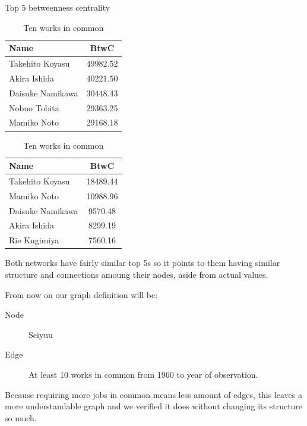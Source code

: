 \begin{frame}{Top 5 betweenness centrality}
\begin{table}[!htb]
    \begin{minipage}{.5\textwidth}
        \centering
            \begin{tabular}{|l|c|}
				\hline
				Name & BtwC \\
				\hline
				Takehito Koyasu & 49982.52 \\
				\hline
				Akira Ishida & 40221.50 \\
				\hline
				Daisuke Namikawa & 30448.43 \\
				\hline
				Nobuo Tobita & 29363.25 \\
				\hline
				Mamiko Noto & 29168.18 \\
				\hline
		\end{tabular}
        \caption{One work in common}
    \end{minipage}%
    \begin{minipage}{.5\textwidth}
        \centering
        \begin{tabular}{|l|c|}
				\hline
				Name & BtwC \\
				\hline
				Takehito Koyasu & 18489.44 \\
				\hline
				Mamiko Noto & 10988.96 \\
				\hline
				Daisuke Namikawa & 9570.48 \\
				\hline
				Akira Ishida & 8299.19 \\
				\hline
				Rie Kugimiya & 7560.16 \\
				\hline
		\end{tabular}
        \caption{Ten works in common}
    \end{minipage}
\end{table}
\end{frame}

\begin{frame}
Both networks have fairly similar top 5s so it points to them having similar structure and connections amoung their nodes, aside from actual values.
\vspace{10pt}

From now on our graph definition will be:
\begin{description}
\item[Node] Seiyuu
\item[Edge] At least 10 works in common from 1960 to year of observation.
\end{description}
\vspace{10pt}

Because requiring more jobs in common means less amount of edges, this leaves a more understandable graph and we verified it does without changing its structure so much.
\end{frame}